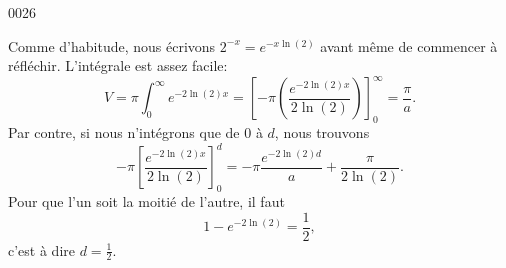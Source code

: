 \begin{corrige}{0026}

Comme d'habitude, nous écrivons $2^{-x}= e^{-x\ln(2)}$ avant même de commencer à réfléchir. L'intégrale est assez facile:
\begin{equation}
	V=\pi\int_0^{\infty} e^{-2\ln(2)x}=\left[ -\pi\left(  \frac{  e^{-2\ln(2)x} }{ 2\ln(2) } \right) \right]_0^{\infty}=\frac{ \pi }{ a }.
\end{equation}
Par contre, si nous n'intégrons que de $0$ à $d$, nous trouvons
\begin{equation}
	-\pi\left[ \frac{  e^{-2\ln(2)x} }{ 2\ln(2) } \right]_0^d=-\pi\frac{  e^{-2\ln(2)d} }{ a }+\frac{ \pi }{ 2\ln(2) }.
\end{equation}
Pour que l'un soit la moitié de l'autre, il faut
\begin{equation}
	1- e^{-2\ln(2)}=\frac{ 1 }{2},
\end{equation}
c'est à dire $d=\frac{1}{ 2 }$.

\end{corrige}
